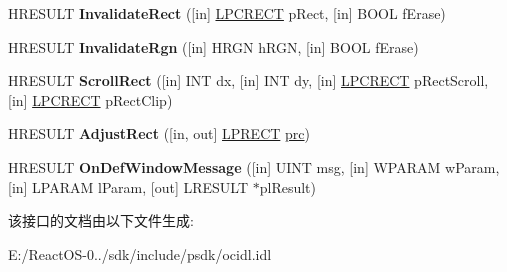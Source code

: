 \begin{DoxyCompactItemize}
H\+R\+E\+S\+U\+LT {\bfseries Invalidate\+Rect} (\mbox{[}in\mbox{]} \hyperlink{structtag_r_e_c_t}{L\+P\+C\+R\+E\+CT} p\+Rect, \mbox{[}in\mbox{]} B\+O\+OL f\+Erase)
\item 
\mbox{\label{interface_i_ole_in_place_site_windowless_aabc9613421be46747f135364c041792f}} 
H\+R\+E\+S\+U\+LT {\bfseries Invalidate\+Rgn} (\mbox{[}in\mbox{]} H\+R\+GN h\+R\+GN, \mbox{[}in\mbox{]} B\+O\+OL f\+Erase)
\item 
\mbox{\label{interface_i_ole_in_place_site_windowless_a923d68b3aafdeb0329f855eab5e184d1}} 
H\+R\+E\+S\+U\+LT {\bfseries Scroll\+Rect} (\mbox{[}in\mbox{]} I\+NT dx, \mbox{[}in\mbox{]} I\+NT dy, \mbox{[}in\mbox{]} \hyperlink{structtag_r_e_c_t}{L\+P\+C\+R\+E\+CT} p\+Rect\+Scroll, \mbox{[}in\mbox{]} \hyperlink{structtag_r_e_c_t}{L\+P\+C\+R\+E\+CT} p\+Rect\+Clip)
\item 
\mbox{\label{interface_i_ole_in_place_site_windowless_a8dcebf20a2bdbb80e423c5f0755c7d64}} 
H\+R\+E\+S\+U\+LT {\bfseries Adjust\+Rect} (\mbox{[}in, out\mbox{]} \hyperlink{structtag_r_e_c_t}{L\+P\+R\+E\+CT} \hyperlink{structtag_r_e_c_t}{prc})
\item 
\mbox{\label{interface_i_ole_in_place_site_windowless_afc9d0448ec8261e13d483645fe7f3f03}} 
H\+R\+E\+S\+U\+LT {\bfseries On\+Def\+Window\+Message} (\mbox{[}in\mbox{]} U\+I\+NT msg, \mbox{[}in\mbox{]} W\+P\+A\+R\+AM w\+Param, \mbox{[}in\mbox{]} L\+P\+A\+R\+AM l\+Param, \mbox{[}out\mbox{]} L\+R\+E\+S\+U\+LT $\ast$pl\+Result)
\end{DoxyCompactItemize}


该接口的文档由以下文件生成\+:\begin{DoxyCompactItemize}
\item 
E\+:/\+React\+O\+S-\/0../sdk/include/psdk/ocidl.\+idl\end{DoxyCompactItemize}
